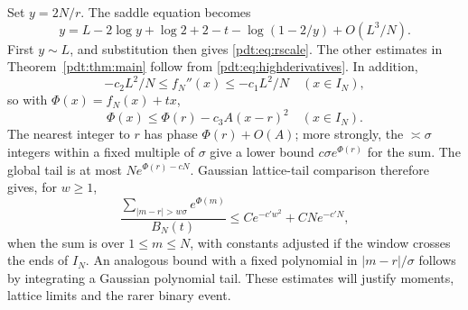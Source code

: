 Set $y=2N/r$. The saddle equation becomes
\[
 y=L-2\log y+\log2+2-t-\log(1-2/y)+O(L^3/N).
\]
First $y\sim L$, and substitution then gives \eqref{pdt:eq:rscale}. The other estimates in Theorem~\ref{pdt:thm:main} follow from \eqref{pdt:eq:highderivatives}. In addition,
\begin{equation}\label{pdt:eq:curvature}
 -c_2L^2/N\le f_N''(x)\le-c_1L^2/N\quad(x\in I_N),
\end{equation}
so with $\Phi(x)=f_N(x)+tx$,
\begin{equation}\label{pdt:eq:gausstail}
 \Phi(x)\le\Phi(r)-c_3 A(x-r)^2\quad(x\in I_N).
\end{equation}
The nearest integer to $r$ has phase $\Phi(r)+O(A)$; more strongly, the $\asymp\sigma$ integers within a fixed multiple of $\sigma$ give a lower bound $c\sigma e^{\Phi(r)}$ for the sum. The global tail is at most $Ne^{\Phi(r)-cN}$. Gaussian lattice-tail comparison therefore gives, for $w\ge1$,
\begin{equation}\label{pdt:eq:relative-tail}
 \frac{\sum_{|m-r|>w\sigma}e^{\Phi(m)}}{B_N(t)}
 \le C e^{-c'w^2}+CNe^{-c'N},
\end{equation}
when the sum is over $1\le m\le N$, with constants adjusted if the window crosses the ends of $I_N$. An analogous bound with a fixed polynomial in $|m-r|/\sigma$ follows by integrating a Gaussian polynomial tail. These estimates will justify moments, lattice limits and the rarer binary event.
